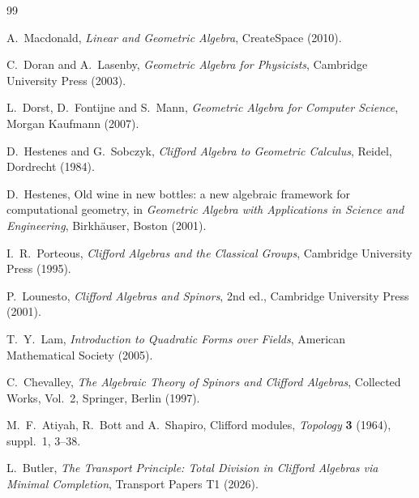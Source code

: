 \documentclass[11pt]{article}
\theoremstyle{plain}
\theoremstyle{definition}
\begin{document}
\begin{thebibliography}{99}

A.~Macdonald,
\emph{Linear and Geometric Algebra},
CreateSpace (2010).

C.~Doran and A.~Lasenby,
\emph{Geometric Algebra for Physicists},
Cambridge University Press (2003).

L.~Dorst, D.~Fontijne and S.~Mann,
\emph{Geometric Algebra for Computer Science},
Morgan Kaufmann (2007).

D.~Hestenes and G.~Sobczyk,
\emph{Clifford Algebra to Geometric Calculus},
Reidel, Dordrecht (1984).

D.~Hestenes,
Old wine in new bottles: a new algebraic framework for computational geometry,
in \emph{Geometric Algebra with Applications in Science and Engineering},
Birkh\"auser, Boston (2001).

I.~R.~Porteous,
\emph{Clifford Algebras and the Classical Groups},
Cambridge University Press (1995).

P.~Lounesto,
\emph{Clifford Algebras and Spinors}, 2nd ed.,
Cambridge University Press (2001).

T.~Y.~Lam,
\emph{Introduction to Quadratic Forms over Fields},
American Mathematical Society (2005).

C.~Chevalley,
\emph{The Algebraic Theory of Spinors and Clifford Algebras},
Collected Works, Vol.~2, Springer, Berlin (1997).

M.~F.~Atiyah, R.~Bott and A.~Shapiro,
Clifford modules,
\emph{Topology} \textbf{3} (1964), suppl.~1, 3--38.

L.~Butler,
\emph{The Transport Principle: Total Division in Clifford Algebras via Minimal Completion},
Transport Papers T1 (2026).

\end{thebibliography}
\end{document}
